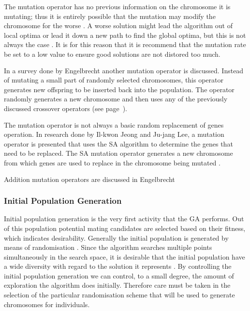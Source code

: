 The mutation operator has no previous information on the chromosome it is mutating; thus it is entirely possible that the mutation may modify the chromosome for the worse \cite{AcceleratingGA}. A worse solution might lead the algorithm out of local optima or lead it down a new path to find the global optima, but this is not always the case \cite{AdaptiveSAGA,FamilyGA,ConstrainedGA}. It is for this reason that it is recommend that the mutation rate be set to a low value to ensure good solutions are not distored too much\cite{CompuIntelligenceIntro}.

In a survey done by Engelbrecht\cite{CompuIntelligenceIntro} another mutation operator is discussed. Instead of mutating a small part of randomly selected chromosomes, this operator generates new offspring to be inserted back into the population. The operator randomly generates a new chromosome and then uses any of the previously discussed crossover operators (see page~\pageref{sec:crossover}).

The mutation operator is not always a basic random replacement of genes operation. In research done by Il-kwon Jeong and Ju-jang Lee\cite{AdaptiveSAGA}, a mutation operator is presented that uses the \gls{SA} algorithm to determine the genes that need to be replaced. The \gls{SA} mutation operator generates a new chromosome from which genes are used to replace in the chromosome being mutated \cite{AdaptiveSAGA}.

Addition mutation operators are discussed in Engelbrecht\cite{CompuIntelligenceIntro}
\subsubsection{Initial Population Generation}
Initial population generation is the very first activity that the \gls{GA} performs. Out of this population potential mating candidates are selected based on their fitness, which indicates desirability. Generally the initial population is generated by means of randomisation \cite{SelfAdaptiveGA}. Since the algorithm searches multiple points simultaneously in the search space, it is desirable that the initial population have a wide diversity with regard to the solution it represents \cite{CombinedBranchBoundGA,DistributedHierarchicalGA}. By controlling the initial population generation we can control, to a small degree, the amount of exploration the algorithm does initially\cite{CombinedBranchBoundGA}. Therefore care must be taken in the selection of the particular randomisation scheme that will be used to generate chromosomes for individuals.

